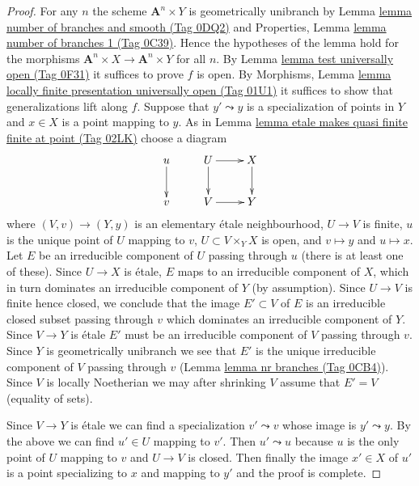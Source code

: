 \documentclass{amsart}
\theoremstyle{plain}
\theoremstyle{definition}
\theoremstyle{remark}
\numberwithin{equation}{subsection}
\begin{document}
\begin{proof}
For any $n$ the scheme $\mathbf{A}^n \times Y$ is geometrically unibranch
by Lemma \href{https://stacks.math.columbia.edu/tag/0DQ2}{lemma number of branches and smooth (Tag 0DQ2)} and
Properties, Lemma \href{https://stacks.math.columbia.edu/tag/0C39}{lemma number of branches 1 (Tag 0C39)}. Hence
the hypotheses of the lemma hold for the morphisms
$\mathbf{A}^n \times X \to \mathbf{A}^n \times Y$ for all $n$.
By Lemma \href{https://stacks.math.columbia.edu/tag/0F31}{lemma test universally open (Tag 0F31)}
it suffices to prove $f$ is open. By Morphisms, Lemma
\href{https://stacks.math.columbia.edu/tag/01U1}{lemma locally finite presentation universally open (Tag 01U1)}
it suffices to show that generalizations lift along $f$.
Suppose that $y' \leadsto y$ is a specialization of points in
$Y$ and $x \in X$ is a point mapping to $y$.
As in Lemma \href{https://stacks.math.columbia.edu/tag/02LK}{lemma etale makes quasi finite finite at point (Tag 02LK)}
choose a diagram
$$
\xymatrix{
u \ar[d] & U \ar[d] \ar[r] & X \ar[d] \\
v & V \ar[r] & Y
}
$$
where $(V, v) \to (Y, y)$ is an elementary \'etale neighbourhood,
$U \to V$ is finite, $u$ is the unique point of $U$ mapping to $v$,
$U \subset V \times_Y X$ is open, and $v \mapsto y$ and $u \mapsto x$.
Let $E$ be an irreducible component of $U$ passing through $u$
(there is at least one of these). Since $U \to X$ is \'etale, $E$
maps to an irreducible component of $X$,
which in turn dominates an irreducible component of $Y$ (by assumption).
Since $U \to V$ is finite hence closed, we conclude that
the image $E' \subset V$ of $E$ is an irreducible closed subset
passing through $v$ which dominates an irreducible component of $Y$.
Since $V \to Y$ is \'etale $E'$ must be an irreducible component
of $V$ passing through $v$.
Since $Y$ is geometrically unibranch we see that $E'$ is the unique irreducible
component of $V$ passing through $v$ (Lemma \href{https://stacks.math.columbia.edu/tag/0CB4}{lemma nr branches (Tag 0CB4)}).
Since $V$ is locally Noetherian we may after shrinking $V$
assume that $E' = V$ (equality of sets).

\medskip\noindent
Since $V \to Y$ is \'etale we can find a specialization
$v' \leadsto v$ whose image is $y' \leadsto y$.
By the above we can find $u' \in U$ mapping to $v'$.
Then $u' \leadsto u$ because $u$ is the only point of
$U$ mapping to $v$ and $U \to V$ is closed.
Then finally the image $x' \in X$ of $u'$ is a point
specializing to $x$ and mapping to $y'$ and the proof is complete.
\end{proof}
\end{document}
